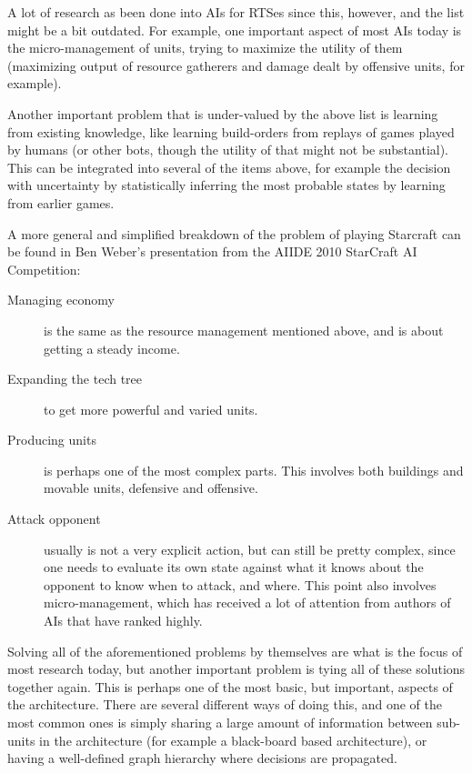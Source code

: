 A lot of research as been done into AIs for RTSes since this, however, and the
list might be a bit outdated. For example, one important aspect of most AIs
today is the micro-management of units, trying to maximize the utility of them 
(maximizing output of resource gatherers and damage dealt by offensive units,
for example).

Another important problem that is under-valued by the above list is learning
from existing knowledge, like learning build-orders from replays of games played
by humans (or other bots, though the utility of that might not be substantial).
This can be integrated into several of the items above, for example the decision
with uncertainty by statistically inferring the most probable states by
learning from earlier games.

A more general and simplified breakdown of the problem of playing Starcraft can
be found in Ben Weber's presentation from the AIIDE 2010 StarCraft AI
Competition:\cite{weber2010aiide}

\begin{description}
  \item [Managing economy] is the same as the resource management mentioned
    above, and is about getting a steady income.
  \item [Expanding the tech tree] to get more powerful and varied units.
  \item [Producing units] is perhaps one of the most complex parts. This
    involves both buildings and movable units, defensive and offensive.
  \item [Attack opponent] usually is not a very explicit action, but can still
    be pretty complex, since one needs to evaluate its own state against what
    it knows about the opponent to know when to attack, and where. This point
    also involves micro-management, which has received a lot of attention from 
    authors of AIs that have ranked highly.
\end{description}

Solving all of the aforementioned problems by themselves are what is the focus
of most research today, but another important problem is tying all of these
solutions together again. This is perhaps one of the most basic, but important,
aspects of the architecture. There are several different ways of doing this, and
one of the most common ones is simply sharing a large amount of information
between sub-units in the architecture (for example a black-board based
architecture), or having a well-defined graph hierarchy where decisions are
propagated.


